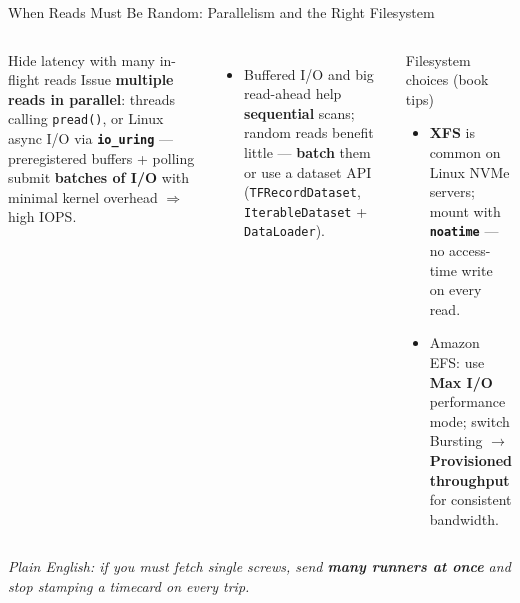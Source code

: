 \documentclass[aspectratio=169]{beamer}
\newcommand{\kw}[1]{\textbf{\textcolor{kwblue}{#1}}}
\newcommand{\pe}[1]{\par{\setlength{\fboxsep}{2.5pt}\noindent\colorbox{navy!9}{\parbox{\dimexpr\textwidth-5pt\relax}{\footnotesize\itshape Plain English: #1}}}}
\begin{document}
\begin{frame}{When Reads Must Be Random: Parallelism and the Right Filesystem}
  \begin{columns}[t]
    \begin{block}{Hide latency with many in-flight reads}
      \small Issue \kw{multiple reads in parallel}: threads calling \texttt{pread()}, or Linux
      async I/O via \kw{\texttt{io\_uring}} --- preregistered buffers + polling submit
      \kw{batches of I/O} with minimal kernel overhead $\Rightarrow$ high IOPS.
    \end{block}
    \begin{itemize}\small
      \item Buffered I/O and big read-ahead help \kw{sequential} scans;
            random reads benefit little --- \kw{batch} them or use a dataset API
            (\texttt{TFRecordDataset}, \texttt{IterableDataset} + \texttt{DataLoader}).
    \end{itemize}
    \begin{block}{Filesystem choices (book tips)}
      \small
      \begin{itemize}\small
        \item \kw{XFS} is common on Linux NVMe servers; mount with \kw{\texttt{noatime}}
              --- no access-time write on every read.
        \item Amazon EFS: use \kw{Max I/O} performance mode; switch Bursting $\to$
              \kw{Provisioned throughput} for consistent bandwidth.
      \end{itemize}
    \end{block}
  \end{columns}
  \pe{if you must fetch single screws, send \kw{many runners at once} and stop stamping a timecard on every trip.}
\end{frame}
\end{document}
